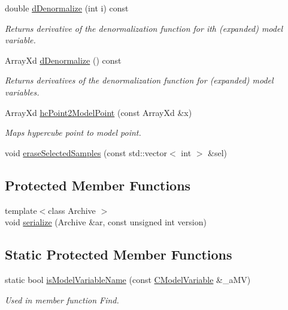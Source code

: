 \begin{DoxyCompactItemize}
double \hyperlink{class_go_s_u_m_1_1_c_model_variables_abc720f34bfd0c1044150675d5cd5594d}{d\-Denormalize} (int i) const 
\begin{DoxyCompactList}\small\item\em Returns derivative of the denormalization function for ith (expanded) model variable. \end{DoxyCompactList}\item 
Array\-Xd \hyperlink{class_go_s_u_m_1_1_c_model_variables_a65b28acfc2b82e889679abf55b94c2c1}{d\-Denormalize} () const 
\begin{DoxyCompactList}\small\item\em Returns derivatives of the denormalization function for (expanded) model variables. \end{DoxyCompactList}\item 
Array\-Xd \hyperlink{class_go_s_u_m_1_1_c_model_variables_a43186a53e67e1cfd7f0115977bac1c17}{hc\-Point2\-Model\-Point} (const Array\-Xd \&x)
\begin{DoxyCompactList}\small\item\em Maps hypercube point to model point. \end{DoxyCompactList}\item 
void \hyperlink{class_go_s_u_m_1_1_c_model_variables_a96c11c4fd04abebab9e981d3bdf3db11}{erase\-Selected\-Samples} (const std\-::vector$<$ int $>$ \&sel)
\end{DoxyCompactItemize}
\subsection*{Protected Member Functions}
\begin{DoxyCompactItemize}
\item 
{\footnotesize template$<$class Archive $>$ }\\void \hyperlink{class_go_s_u_m_1_1_c_model_variables_aa2274914e5ce27be8925b5894b425fa3}{serialize} (Archive \&ar, const unsigned int version)
\end{DoxyCompactItemize}
\subsection*{Static Protected Member Functions}
\begin{DoxyCompactItemize}
\item 
static bool \hyperlink{class_go_s_u_m_1_1_c_model_variables_ae9f6f163a086ba7c964ff8cf85a6cfb4}{is\-Model\-Variable\-Name} (const \hyperlink{class_go_s_u_m_1_1_c_model_variable}{C\-Model\-Variable} \&\-\_\-a\-M\-V)
\begin{DoxyCompactList}\small\item\em Used in member function Find. \end{DoxyCompactList}\end{DoxyCompactItemize}
